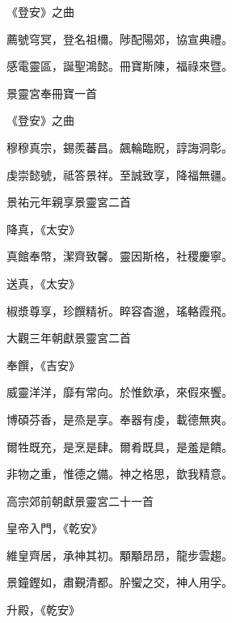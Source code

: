 \begin{pinyinscope}
 《登安》之曲



 薦號穹冥，登名祖檷。陟配陽郊，協宣典禮。



 感電靈區，誕聖鴻懿。冊寶斯陳，福祿來暨。



 景靈宮奉冊寶一首



 《登安》之曲



 穆穆真宗，錫羨蕃昌。飆輪臨貺，諄誨洞彰。



 虔崇懿號，祗答景祥。至誠致享，降福無疆。



 景祐元年親享景靈宮二首



 降真，《太安》



 真館奉幣，潔齊致馨。靈因斯格，社稷慶寧。



 送真，《太安》



 椒漿尊享，珍饌精祈。睟容杳邈，瑤輅霞飛。



 大觀三年朝獻景靈宮二首



 奉饌，《吉安》



 威靈洋洋，靡有常向。於惟欽承，來假來饗。



 博碩芬香，是烝是享。奉器有虔，載德無爽。



 爾牲既充，是烹是肆。爾肴既具，是羞是饋。



 非物之重，惟德之備。神之格思，歆我精意。



 高宗郊前朝獻景靈宮二十一首



 皇帝入門，《乾安》



 維皇齊居，承神其初。顒顒昂昂，龍步雲趨。



 景鐘鏗如，肅覲清都。肸蠁之交，神人用孚。



 升殿，《乾安》




\end{pinyinscope}
